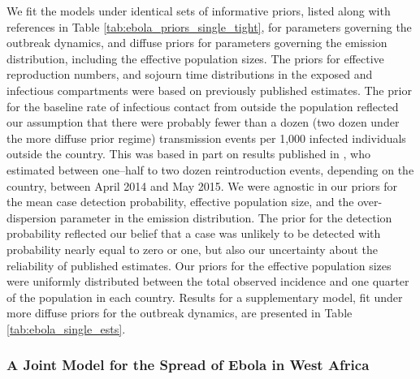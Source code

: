 We fit the models under identical sets of informative priors, listed along with references in Table \ref{tab:ebola_priors_single_tight}, for parameters governing the outbreak dynamics, and diffuse priors for parameters governing the emission distribution, including the effective population sizes. The priors for effective reproduction numbers, and sojourn time distributions in the exposed and infectious compartments were based on previously published estimates. The prior for the baseline rate of infectious contact from outside the population reflected our assumption that there were probably fewer than a dozen (two dozen under the more diffuse prior regime) transmission events per 1,000 infected individuals outside the country. This was based in part on results published in \cite{dudas2017virus}, who estimated between one--half to two dozen reintroduction events, depending on the country, between April 2014 and May 2015. We were agnostic in our priors for the mean case detection probability, effective population size, and the over-dispersion parameter in the emission distribution. The prior for the detection probability reflected our belief that a case was unlikely to be detected with probability nearly equal to zero or one, but also our uncertainty about the reliability of published estimates. Our priors for the effective population sizes were uniformly distributed between the total observed incidence and one quarter of the population in each country. Results for a supplementary model, fit under more diffuse priors for the outbreak dynamics, are presented in Table \ref{tab:ebola_single_ests}.

\subsubsection{A Joint Model for the Spread of Ebola in West Africa}
\label{subsubsec:ebola_joint_model}

